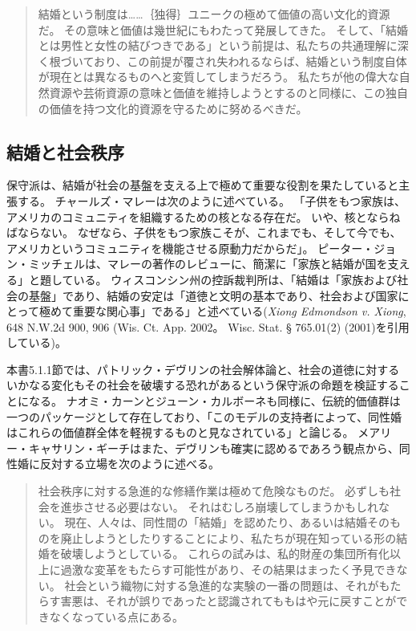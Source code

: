 \documentclass[paper=a4,book,openany]{jlreq}
\newcommand{\ig}[1]{}           %
\begin{document}
\begin{quote}

結婚という制度は……｛独得｝{ユニーク}の極めて価値の高い文化的資源だ。
その意味と価値は幾世紀にもわたって発展してきた。
そして、「結婚とは男性と女性の結びつきである」という前提は、私たちの共通理解に深く根づいており、この前提が覆され失われるならば、結婚という制度自体が現在とは異なるものへと変質してしまうだろう。
私たちが他の偉大な自然資源や芸術資源の意味と価値を維持しようとするのと同様に、この独自の価値を持つ文化的資源を守るために努めるべきだ。
\citep[pp.87--88]{dworkin06:_is_democ_possib_here}

\end{quote}

\subsection{結婚と社会秩序}

保守派は、結婚が社会の基盤を支える上で極めて重要な役割を果たしていると主張する。
チャールズ・マレーは次のように述べている。
「子供をもつ家族は、アメリカのコミュニティを組織するための核となる存在だ。
いや、核とならねばならない。
なぜなら、子供をもつ家族こそが、これまでも、そして今でも、アメリカというコミュニティを機能させる原動力だからだ」\citep[p.169]{murray12:_comin_apart}。
ピーター・ジョン・ミッチェル\ig{Peter Jon Mitchell}は、マレーの著作のレビューに、簡潔に「家族と結婚が国を支える」と題している\citep{mitchell12:_famil_marriag_hold_count_toget}。
ウィスコンシン州の控訴裁判所は、「結婚は「家族および社会の基盤」であり、結婚の安定は「道徳と文明の基本であり、社会および国家にとって極めて重要な関心事」である」と述べている(\emph{Xiong Edmondson v. Xiong}, 648 N.W.2d 900, 906 (Wis. Ct. App. 2002。
Wisc. Stat.  § 765.01(2) (2001)を引用している)。

本書5.1.1節では、パトリック・デヴリンの社会解体論と、社会の道徳に対するいかなる変化もその社会を破壊する恐れがあるという保守派の命題を検証することになる。
ナオミ・カーンとジューン・カルボーネも同様に、伝統的価値群は一つのパッケージとして存在しており、「このモデルの支持者によって、同性婚はこれらの価値群全体を軽視するものと見なされている」と論じる\citep[pp.1--2]{cahn10:_red_famil}。
メアリー・キャサリン・ギーチはまた、デヴリン\ig{Patrick Devlin}も確実に認めるであろう観点から、同性婚に反対する立場を次のように述べる。

\begin{quote}
社会秩序に対する急進的な修繕作業は極めて危険なものだ。
必ずしも社会を進歩させる必要はない。
それはむしろ崩壊してしまうかもしれない。
現在、人々は、同性間の「結婚」を認めたり、あるいは結婚そのものを廃止しようとしたりすることにより、私たちが現在知っている形の結婚を破壊しようとしている。
これらの試みは、私的財産の集団所有化以上に過激な変革をもたらす可能性があり、その結果はまったく予見できない。
社会という織物に対する急進的な実験の一番の問題は、それがもたらす害悪は、それが誤りであったと認識されてももはや元に戻すことができなくなっている点にある。
\citep[p.532]{geach08:_lying_body}

\end{quote}
\end{document}
